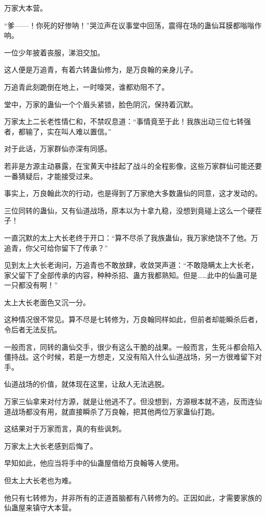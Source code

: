 
\begin{this_body}

万家大本营。

“爹——！你死的好惨呐！”哭泣声在议事堂中回荡，震得在场的蛊仙耳膜都嗡嗡作响。

一位少年披着丧服，涕泪交加。

这人便是万追青，有着六转蛊仙修为，是万良翰的亲身儿子。

万追青此刻跪倒在地上，一时嚎哭，谁都劝阻不了。

堂中，万家的蛊仙一个个眉头紧锁，脸色阴沉，保持着沉默。

万家太上二长老性情仁和，不禁叹息道：“事情竟至于此！我族出动三位七转强者，都输了，实在叫人难以置信。”

对于此话，万家群仙亦深有同感。

若非是方源主动暴露，在宝黄天中挂起了战斗的全程影像，这些万家群仙可能还要一番猜疑后，才能接受过来。

事实上，万良翰此次的行动，也是得到了万家绝大多数蛊仙的同意，这才发动的。

三位同转的蛊仙，又有仙道战场，原本以为十拿九稳，没想到竟碰上这么一个硬茬子！

一直沉默的太上大长老终于开口：“算不尽杀了我族蛊仙，我万家绝饶不了他。万追青，你父可给你留下了传承？”

见到太上大长老询问，万追青也不敢放肆，收敛哭声道：“不敢隐瞒太上大长老，家父留下了全部传承的内容，种种杀招、蛊方我都熟知。但是……此中的仙蛊可是一只都没有啊！”

太上大长老面色又沉一分。

这种情况很不常见。算不尽是七转修为，万良翰同样如此，但前者却能瞬杀后者，令后者无法反抗。

一般而言，同转的蛊仙交手，很少有这么干脆的战果。一般而言，生死斗都会陷入僵持战。这个时候，若是一方想走，又没有陷入什么仙道战场，另一方很难留下对手。

仙道战场的价值，就体现在这里，让敌人无法逃脱。

万家三仙拿来对付方源，就是让他逃不了。但没想到，方源根本就不逃，反而连仙道战场都没有用，就直接瞬杀了万良翰，把其他两位万家蛊仙打跑。

这结果对于万家而言，真的有些讽刺。

万家太上大长老感到后悔了。

早知如此，他应当将手中的仙蛊屋借给万良翰等人使用。

但太上大长老也为难。

他只有七转修为，并非所有的正道首脑都有八转修为的。正因如此，才需要家族的仙蛊屋来镇守大本营。


\end{this_body}

